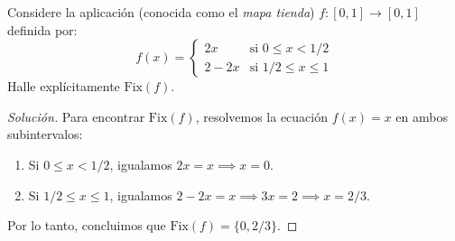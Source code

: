 \begin{ejemplo}
	Considere la aplicación (conocida como el \textit{mapa tienda}) $f: [0,1] \to [0,1]$ definida por:
	$$ f(x) = \begin{cases} 
		2x & \text{si } 0 \le x < 1/2 \\ 
		2 - 2x & \text{si } 1/2 \le x \le 1 
	\end{cases} $$
	Halle explícitamente $\text{Fix}(f)$.
\end{ejemplo}

\begin{proof}[Solución]
	Para encontrar $\text{Fix}(f)$, resolvemos la ecuación $f(x)=x$ en ambos subintervalos:
	\begin{enumerate}
		\item Si $0 \le x < 1/2$, igualamos $2x = x \implies x = 0$.
		\item Si $1/2 \le x \le 1$, igualamos $2 - 2x = x \implies 3x = 2 \implies x = 2/3$.
	\end{enumerate}
	Por lo tanto, concluimos que $\text{Fix}(f) = \{0, 2/3\}$.
\end{proof}

